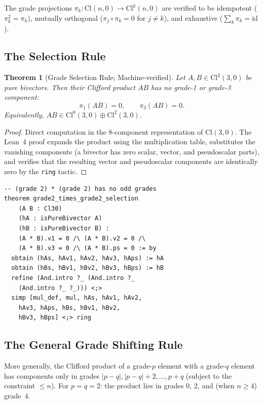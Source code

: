 \documentclass[11pt]{article}
\newtheorem{theorem}{Theorem}[section]
\newcommand{\Cl}{\mathrm{Cl}}
\begin{document}
The grade projections $\pi_k : \Cl(n,0) \to \Cl^k(n,0)$ are verified
to be idempotent ($\pi_k^2 = \pi_k$), mutually orthogonal
($\pi_j \circ \pi_k = 0$ for $j \neq k$), and exhaustive
($\sum_k \pi_k = \mathrm{id}$).

\subsection{The Selection Rule}

\begin{theorem}[Grade Selection Rule; Machine-verified]
\label{thm:selection-rule}
Let $A, B \in \Cl^2(3,0)$ be pure bivectors. Then their Clifford
product $AB$ has no grade-1 or grade-3 component:
\begin{equation}\label{eq:selection-rule}
  \pi_1(AB) = 0, \qquad \pi_3(AB) = 0.
\end{equation}
Equivalently, $AB \in \Cl^0(3,0) \oplus \Cl^2(3,0)$.
\end{theorem}

\begin{proof}
Direct computation in the 8-component representation of $\Cl(3,0)$.
The Lean~4 proof expands the product using the multiplication table,
substitutes the vanishing components (a bivector has zero scalar,
vector, and pseudoscalar parts), and verifies that the resulting vector
and pseudoscalar components are identically zero by the \texttt{ring}
tactic.
\end{proof}

\begin{lstlisting}[caption={Grade selection rule (from \texttt{block\_tridiagonal.lean}).}]
-- (grade 2) * (grade 2) has no odd grades
theorem grade2_times_grade2_selection
    (A B : Cl30)
    (hA : isPureBivector A)
    (hB : isPureBivector B) :
    (A * B).v1 = 0 /\ (A * B).v2 = 0 /\
    (A * B).v3 = 0 /\ (A * B).ps = 0 := by
  obtain (hAs, hAv1, hAv2, hAv3, hAps) := hA
  obtain (hBs, hBv1, hBv2, hBv3, hBps) := hB
  refine (And.intro ?_ (And.intro ?_
    (And.intro ?_ ?_))) <;>
  simp [mul_def, mul, hAs, hAv1, hAv2,
    hAv3, hAps, hBs, hBv1, hBv2,
    hBv3, hBps] <;> ring
\end{lstlisting}

\subsection{The General Grade Shifting Rule}

More generally, the Clifford product of a grade-$p$ element with a
grade-$q$ element has components only in grades
$|p - q|, |p - q| + 2, \ldots, p + q$ (subject to the constraint
$\leq n$). For $p = q = 2$: the product lies in grades $0$, $2$,
and (when $n \geq 4$) grade~$4$.
\end{document}
